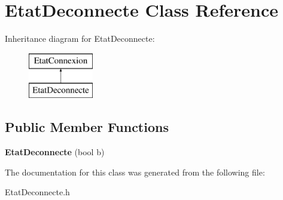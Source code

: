 \section{Etat\-Deconnecte Class Reference}
\label{class_etat_deconnecte}
Inheritance diagram for Etat\-Deconnecte\-:\begin{figure}[H]
\begin{center}
\leavevmode
\includegraphics[height=2.000000cm]{class_etat_deconnecte}
\end{center}
\end{figure}
\subsection*{Public Member Functions}
\begin{DoxyCompactItemize}
\item 
{\bfseries Etat\-Deconnecte} (bool b)\label{class_etat_deconnecte_add0d9bf610ab5ca451880beacd6f0490}

\end{DoxyCompactItemize}


The documentation for this class was generated from the following file\-:\begin{DoxyCompactItemize}
\item 
Etat\-Deconnecte.\-h\end{DoxyCompactItemize}
